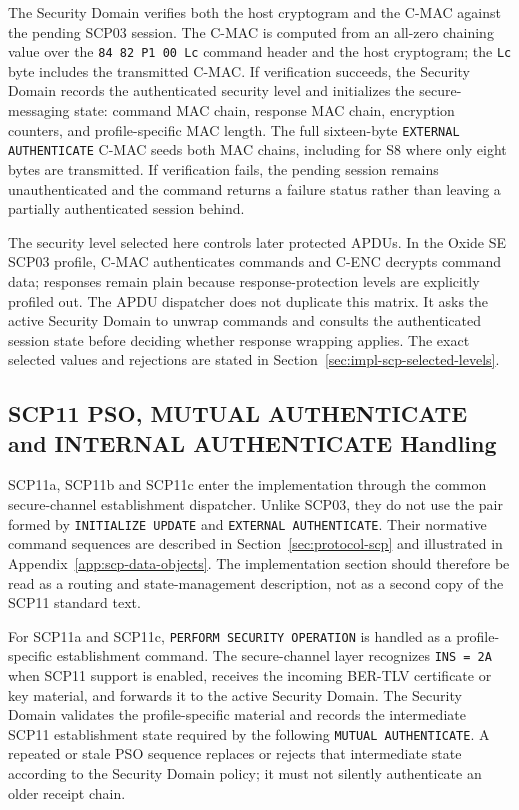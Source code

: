 The Security Domain verifies both the host cryptogram and the C-MAC against the
pending SCP03 session. The C-MAC is computed from an all-zero chaining value
over the \texttt{84 82 P1 00 Lc} command header and the host cryptogram; the
\texttt{Lc} byte includes the transmitted C-MAC. If verification succeeds, the
Security Domain records the authenticated security level and initializes the
secure-messaging state: command MAC chain, response MAC chain, encryption
counters, and profile-specific MAC length. The full sixteen-byte
\texttt{EXTERNAL AUTHENTICATE} C-MAC seeds both MAC chains, including for S8
where only eight bytes are transmitted. If verification fails, the pending
session remains unauthenticated and the command returns a failure status rather
than leaving a partially authenticated session behind.

The security level selected here controls later protected APDUs. In the
Oxide SE SCP03 profile, C-MAC authenticates commands and C-ENC decrypts command
data; responses remain plain because response-protection levels are explicitly
profiled out. The APDU dispatcher does not duplicate this matrix. It asks the
active Security Domain to unwrap commands and consults the authenticated
session state before deciding whether response wrapping applies. The exact
selected values and rejections are stated in
Section~\ref{sec:impl-scp-selected-levels}.

\subsection{SCP11 PSO, MUTUAL AUTHENTICATE and INTERNAL AUTHENTICATE Handling}
\label{sec:impl-scp11-establishment}

SCP11a, SCP11b and SCP11c enter the implementation through the common
secure-channel establishment dispatcher. Unlike SCP03, they do not use the
pair formed by \texttt{INITIALIZE UPDATE} and
\texttt{EXTERNAL AUTHENTICATE}. Their normative command sequences are described
in Section~\ref{sec:protocol-scp} and illustrated in
Appendix~\ref{app:scp-data-objects}. The implementation section should
therefore be read as a routing and state-management description, not as a
second copy of the SCP11 standard text.

For SCP11a and SCP11c, \texttt{PERFORM SECURITY OPERATION} is handled as a
profile-specific establishment command. The secure-channel layer recognizes
\texttt{INS = 2A} when SCP11 support is enabled, receives the incoming BER-TLV
certificate or key material, and forwards it to the active Security Domain. The
Security Domain validates the profile-specific material and records the
intermediate SCP11 establishment state required by the following
\texttt{MUTUAL AUTHENTICATE}. A repeated or stale PSO sequence replaces or
rejects that intermediate state according to the Security Domain policy; it
must not silently authenticate an older receipt chain.

